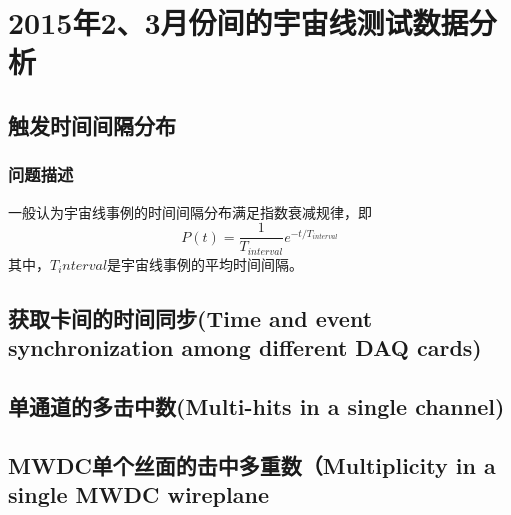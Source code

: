 \chapter{2015年2、3月份间的宇宙线测试数据分析}

\section{触发时间间隔分布}
\subsection{问题描述}
一般认为宇宙线事例的时间间隔分布满足指数衰减规律，即
\begin{equation}
	P(t) = \frac{1}{T_{interval}}e^{-t/T_{interval}}
\end{equation}
其中，$T_interval$是宇宙线事例的平均时间间隔。

\section{获取卡间的时间同步(Time and event synchronization among different DAQ cards)}

\section{单通道的多击中数(Multi-hits in a single channel)}

\section{MWDC单个丝面的击中多重数（Multiplicity in a single MWDC wireplane}